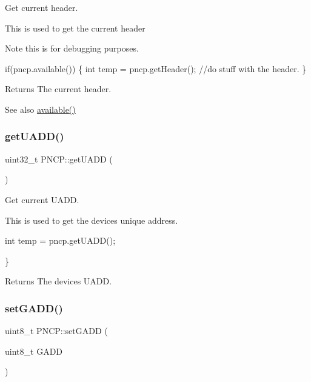 Get current header. 

This is used to get the current header \begin{DoxyNote}{Note}
this is for debugging purposes. 
\begin{DoxyCode}
\textcolor{keywordflow}{if}(pncp.available())
\{
\textcolor{keywordtype}{int} temp = pncp.getHeader();
\textcolor{comment}{//do stuff with the header.}
\}
\end{DoxyCode}
 
\end{DoxyNote}
\begin{DoxyReturn}{Returns}
The current header. 
\end{DoxyReturn}
\begin{DoxySeeAlso}{See also}
\hyperlink{class_p_n_c_p_a153136448f88a3d2ac580c329620aea4}{available()} 
\end{DoxySeeAlso}
\mbox{\label{class_p_n_c_p_a5690f103c1f9878652ed09fff85bafb8}} 
\subsubsection{\texorpdfstring{get\+U\+A\+D\+D()}{getUADD()}}
{\footnotesize\ttfamily uint32\+\_\+t P\+N\+C\+P\+::get\+U\+A\+DD (\begin{DoxyParamCaption}{ }\end{DoxyParamCaption})}



Get current U\+A\+DD. 

This is used to get the devices unique address. 
\begin{DoxyCode}
\textcolor{keywordtype}{int} temp = pncp.getUADD();

\}
\end{DoxyCode}
 \begin{DoxyReturn}{Returns}
The devices U\+A\+DD. 
\end{DoxyReturn}
\mbox{\label{class_p_n_c_p_a14efa4c46289d86be1a49f8e5594f396}} 
\subsubsection{\texorpdfstring{set\+G\+A\+D\+D()}{setGADD()}}
{\footnotesize\ttfamily uint8\+\_\+t P\+N\+C\+P\+::set\+G\+A\+DD (\begin{DoxyParamCaption}\item[{uint8\+\_\+t}]{G\+A\+DD }\end{DoxyParamCaption})}



